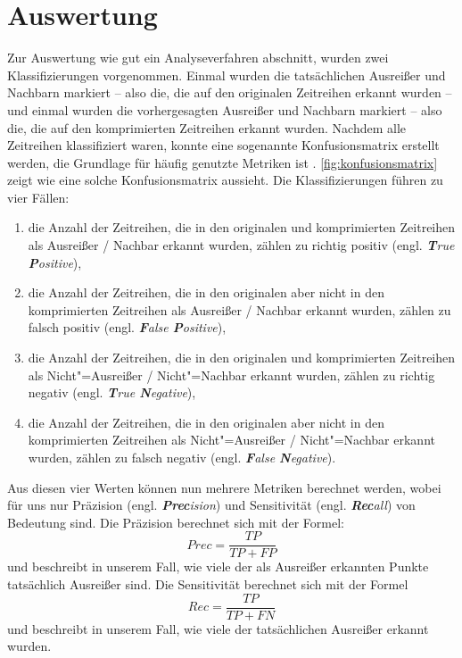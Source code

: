 \section{Auswertung}\label{sec:auswertung}
\newcommand{\tikztextc}[3]{\node at (#1, #2) {\vphantom{/}\smash{#3}};}
\newcommand{\tikztextupc}[3]{\node at (#1, #2) [rotate = 90] {\vphantom{/}\smash{#3}};}
Zur Auswertung wie gut ein Analyseverfahren abschnitt, wurden zwei Klassifizierungen vorgenommen. Einmal wurden die tatsächlichen Ausreißer und Nachbarn markiert -- also die, die auf den originalen Zeitreihen erkannt wurden -- und einmal wurden die vorhergesagten Ausreißer und Nachbarn markiert -- also die, die auf den komprimierten Zeitreihen erkannt wurden. Nachdem alle Zeitreihen klassifiziert waren, konnte eine sogenannte Konfusionsmatrix erstellt werden, die Grundlage für häufig genutzte Metriken ist \cite{konfusionsmatrix}. \autoref{fig:konfusionsmatrix} zeigt wie eine solche Konfusionsmatrix aussieht. Die Klassifizierungen führen zu vier Fällen: \begin{enumerate}
    \item die Anzahl der Zeitreihen, die in den originalen und komprimierten Zeitreihen als Ausreißer / Nachbar erkannt wurden, zählen zu richtig positiv (engl. \textit{\textbf{T}rue \textbf{P}ositive}),
    \item die Anzahl der Zeitreihen, die in den originalen aber nicht in den komprimierten Zeitreihen als Ausreißer / Nachbar erkannt wurden, zählen zu falsch positiv (engl. \textit{\textbf{F}alse \textbf{P}ositive}),
    \item die Anzahl der Zeitreihen, die in den originalen und komprimierten Zeitreihen als Nicht"=Ausreißer / Nicht"=Nachbar erkannt wurden, zählen zu richtig negativ (engl. \textit{\textbf{T}rue \textbf{N}egative}),
    \item die Anzahl der Zeitreihen, die in den originalen aber nicht in den komprimierten Zeitreihen als Nicht"=Ausreißer / Nicht"=Nachbar erkannt wurden, zählen zu falsch negativ (engl. \textit{\textbf{F}alse \textbf{N}egative}).
\end{enumerate} 
Aus diesen vier Werten können nun mehrere Metriken berechnet werden, wobei für uns nur Präzision (engl. \textit{\textbf{Prec}ision}) und Sensitivität (engl. \textit{\textbf{Rec}all}) von Bedeutung sind. Die Präzision berechnet sich mit der Formel: \[Prec = \frac{TP}{TP + FP}\]
und beschreibt in unserem Fall, wie viele der als Ausreißer erkannten Punkte tatsächlich Ausreißer sind. Die Sensitivität berechnet sich mit der Formel \[Rec = \frac{TP}{TP + FN}\] und beschreibt in unserem Fall, wie viele der tatsächlichen Ausreißer erkannt wurden.
